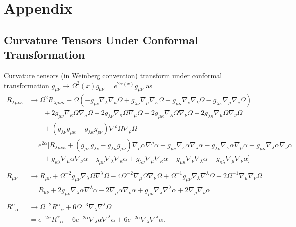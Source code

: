 \documentclass[10pt,letterpaper]{article}
\numberwithin{equation}{subsection}
\begin{document}
\newpage
\appendix
\section{Appendix}
\subsection{Curvature Tensors Under Conformal Transformation}
Curvature tensors (in Weinberg convention) transform under conformal transformation $g_{\mu\nu}\to \Omega^2(x)g_{\mu\nu} = e^{2\alpha(x)}g_{\mu\nu}$  as 
\begin{align}
R_{\lambda\mu\nu\kappa} &\to \Omega^2 R_{\lambda\mu\nu\kappa} + \Omega\left ( -g_{\mu\nu}\nabla_\lambda \nabla_\kappa \Omega
+ g_{\lambda\nu}\nabla_\mu\nabla_\kappa \Omega + g_{\mu\kappa} \nabla_\nu\nabla_\lambda \Omega - g_{\lambda\kappa} \nabla_\mu\nabla_\nu \Omega \right)
\nonumber\\
&\qquad+ 2g_{\mu\nu} \nabla_\kappa\Omega \nabla_\lambda\Omega - 2g_{\lambda\nu} \nabla_\kappa\Omega \nabla_\mu\Omega - 2g_{\mu\kappa}
\nabla_\lambda\Omega \nabla_\nu\Omega + 2g_{\lambda\kappa} \nabla_\mu \Omega \nabla_\nu\Omega
\nonumber\\
&\qquad + (g_{\lambda\nu} g_{\mu\kappa}-g_{\lambda\kappa}g_{\mu\nu})\nabla^\rho \Omega \nabla_\rho \Omega
\nonumber\\
&= e^{2\alpha}\bigg[ R_{\lambda\mu\nu\kappa} + (g_{\mu\kappa}g_{\lambda\nu} - g_{\lambda\kappa}g_{\mu\nu})\nabla_\rho\alpha \nabla^\rho\alpha+
g_{\mu\nu} \nabla_\kappa\alpha \nabla_\lambda\alpha - g_{\lambda\nu} \nabla_\kappa\alpha \nabla_\mu\alpha - g_{\mu\kappa} \nabla_\lambda\alpha
\nabla_\nu\alpha 
\nonumber\\
&\qquad + g_{\kappa\lambda}\nabla_\mu\alpha\nabla_\nu\alpha - g_{\mu\nu}\nabla_\lambda\nabla_\kappa \alpha + g_{\lambda\nu} \nabla_\mu\nabla_\kappa\alpha + g_{\mu\kappa}\nabla_\nu\nabla_\lambda \alpha -
g_{\kappa\lambda}\nabla_\mu\nabla_\nu\alpha\bigg]
 \label{GRA11} \\
{}
\nonumber\\
R_{\mu\nu} &\to R_{\mu\nu} + \Omega^{-2} g_{\mu\nu}\nabla_\lambda \Omega \nabla^\lambda \Omega
	-4 \Omega^{-2} \nabla_\mu \Omega \nabla_\nu \Omega + \Omega^{-1} g_{\mu\nu}\nabla_\lambda \nabla^\lambda \Omega + 2\Omega^{-1}
	\nabla_\mu \nabla_\nu \Omega
\nonumber\\
&= R_{\mu\nu} + 2 g_{\mu\nu}\nabla_\lambda \alpha \nabla^\lambda\alpha - 2 \nabla_\mu\alpha \nabla_\nu \alpha +  g_{\mu\nu} \nabla_\lambda \nabla^\lambda
\alpha + 2\nabla_\mu \nabla_\nu \alpha 
\label{GRA12} \\ 
{}
\nonumber\\
R^\alpha{}_\alpha &\to \Omega^{-2}R^{\alpha}{}_\alpha + 6\Omega^{-3}\nabla_\lambda \nabla^\lambda \Omega
\nonumber\\
&= e^{-2\alpha} R^{\alpha}{}_\alpha + 6 e^{-2\alpha}\nabla_\lambda\alpha \nabla^\lambda\alpha + 6 e^{-2\alpha}\nabla_\lambda \nabla^\lambda \alpha.
\label{GRA13}
\end{align}
\end{document}
